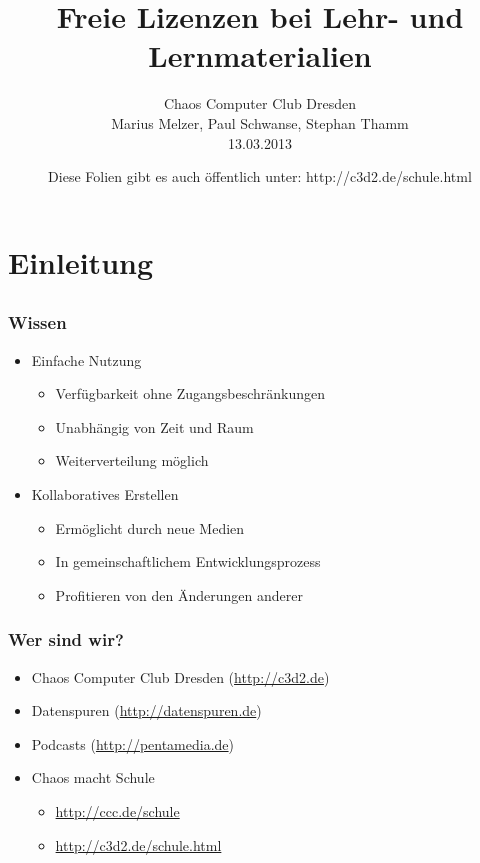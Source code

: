 \documentclass[table]{beamer}
\title{Freie Lizenzen bei Lehr- und Lernmaterialien}
\author{Chaos Computer Club Dresden\\Marius Melzer, Paul Schwanse, Stephan Thamm\\13.03.2013}
\date{Diese Folien gibt es auch öffentlich unter: http://c3d2.de/schule.html}
\begin{document}
\maketitle

\frame{\tableofcontents[hideallsubsections]}

\section{Einleitung}
\subsection{}

\begin{frame}
    \frametitle{Wissen}
    \begin{itemize}
      \item<2-> Einfache Nutzung
      \begin{itemize}
        \item<3-> Verfügbarkeit ohne Zugangsbeschränkungen
        \item<4-> Unabhängig von Zeit und Raum
        \item<5-> Weiterverteilung möglich
      \end{itemize}
      \item<6-> Kollaboratives Erstellen
      \begin{itemize}
        \item<7-> Ermöglicht durch neue Medien
        \item<8-> In gemeinschaftlichem Entwicklungsprozess
        \item<9-> Profitieren von den Änderungen anderer
      \end{itemize}
    \end{itemize}
\end{frame}
 
\begin{frame}
    \frametitle{Wer sind wir?}
    \begin{itemize}
        \item<2-> Chaos Computer Club Dresden (\url{http://c3d2.de})
            \note{}
        \item<3-> Datenspuren (\url{http://datenspuren.de})
        \item<4-> Podcasts (\url{http://pentamedia.de})
        \item<5-> Chaos macht Schule
            \begin{itemize}
                \item<2-> \url{http://ccc.de/schule}
                \item<2-> \url{http://c3d2.de/schule.html}
            \end{itemize}
    \end{itemize}
\end{frame}
\end{document}
